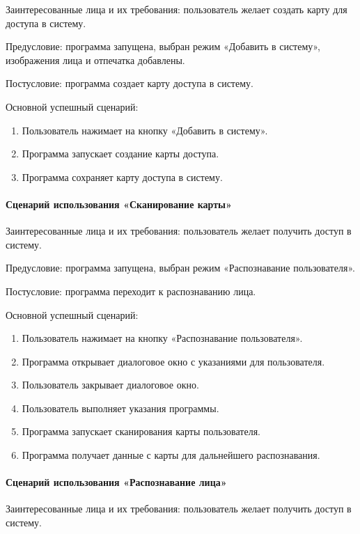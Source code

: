 Заинтересованные лица и их требования: пользователь желает создать карту для доступа в систему.

Предусловие: программа запущена, выбран режим «Добавить в систему», изображения лица и отпечатка добавлены.

Постусловие: программа создает карту доступа в систему.

Основной успешный сценарий:
\begin{enumerate}
	\item Пользователь нажимает на кнопку «Добавить в систему».
	\item Программа запускает создание карты доступа.
	\item Программа сохраняет карту доступа в систему.
\end{enumerate}

\paragraph{Сценарий использования «Сканирование карты»}

Заинтересованные лица и их требования: пользователь желает получить доступ в систему.

Предусловие: программа запущена, выбран режим «Распознавание пользователя».

Постусловие: программа переходит к распознаванию лица.

Основной успешный сценарий:
\begin{enumerate}
	\item Пользователь нажимает на кнопку «Распознавание пользователя».
	\item Программа открывает диалоговое окно с указаниями для пользователя.
	\item Пользователь закрывает диалоговое окно.
	\item Пользователь выполняет указания программы.
	\item Программа запускает сканирования карты пользователя.
	\item Программа получает данные с карты для дальнейшего распознавания.
\end{enumerate}

\paragraph{Сценарий использования «Распознавание лица»}

Заинтересованные лица и их требования: пользователь желает получить доступ в систему.

